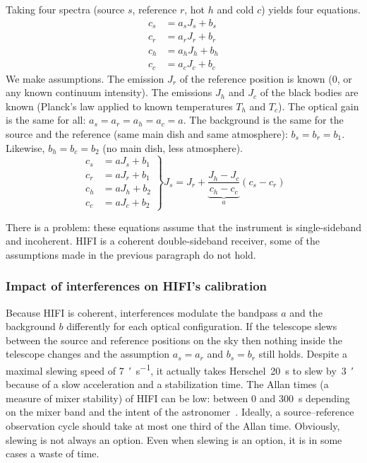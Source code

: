 Taking four spectra (source $s$, reference $r$, hot $h$ and cold $c$) yields four equations.
\begin{equation}
    \begin{aligned}
        c_s &= a_s J_s + b_s\\
        c_r &= a_r J_r + b_r\\
        c_h &= a_h J_h + b_h\\
        c_c &= a_c J_c + b_c
    \end{aligned}
\end{equation}
We make assumptions.
The emission $J_r$ of the reference position is known (0, or any known continuum intensity).
The emissions $J_h$ and $J_c$ of the black bodies are known (Planck's law applied to known temperatures $T_h$ and $T_c$).
The optical gain is the same for all: $a_s = a_r = a_h = a_c = a$.
The background is the same for the source and the reference (same main dish and same atmosphere): $b_s = b_r = b_1$.
Likewise, $b_h = b_c = b_2$ (no main dish, less atmosphere).
\begin{equation}
    \left.
    \begin{aligned}
        c_s &= a   J_s + b_1\\
        c_r &= a   J_r + b_1\\
        c_h &= a   J_h + b_2\\
        c_c &= a   J_c + b_2
    \end{aligned}
    \right\rbrace
    J_s = J_r +
    \underbrace{
        \frac{J_h - J_c}{c_h - c_c}
    }_{a}
    (c_s - c_r)
    \label{eq:ideal_calibration}
\end{equation}

There is a problem: these equations assume that the instrument is single-sideband and incoherent.
HIFI is a coherent double-sideband receiver, some of the assumptions made in the previous paragraph do not hold.

\subsubsection{Impact of interferences on HIFI's calibration}

Because HIFI is coherent, interferences modulate the bandpass $a$ and the background $b$ differently for each optical configuration.
If the telescope slews between the source and reference positions on the sky then nothing inside the telescope changes and the assumption $a_s=a_r$ and $b_s=b_r$ still holds.
Despite a maximal slewing speed of \SI{7}{\arcmin\per\second}, it actually takes Herschel~\SI{20}{\second} to slew by~\SI{3}{\arcmin} because of a slow acceleration and a stabilization time.
The Allan times (a measure of mixer stability) of HIFI can be low: between 0 and \SI{300}{\second} depending on the mixer band and the intent of the astronomer~\parencite{ossenkopf2008stability}.
Ideally, a source--reference observation cycle should take at most one third of the Allan time.
Obviously, slewing is not always an option.
Even when slewing is an option, it is in some cases a waste of time.

